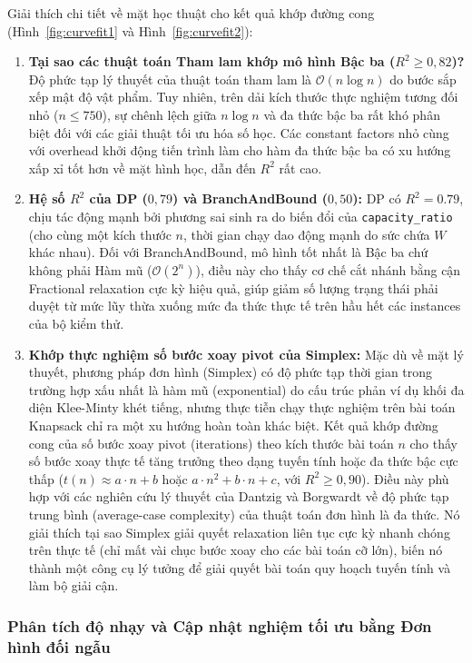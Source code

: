 \documentclass[fontsize=13pt,a4paper]{report}
\begin{document}
Giải thích chi tiết về mặt học thuật cho kết quả khớp đường cong (Hình~\ref{fig:curvefit1} và Hình~\ref{fig:curvefit2}):
\begin{enumerate}[leftmargin=*]
    \item \textbf{Tại sao các thuật toán Tham lam khớp mô hình Bậc ba ($R^2 \ge 0,82$)?}
    Độ phức tạp lý thuyết của thuật toán tham lam là $\mathcal{O}(n \log n)$ do bước sắp xếp mật độ vật phẩm. Tuy nhiên, trên dải kích thước thực nghiệm tương đối nhỏ ($n \le 750$), sự chênh lệch giữa $n \log n$ và đa thức bậc ba rất khó phân biệt đối với các giải thuật tối ưu hóa số học. Các constant factors nhỏ cùng với overhead khởi động tiến trình làm cho hàm đa thức bậc ba có xu hướng xấp xỉ tốt hơn về mặt hình học, dẫn đến $R^2$ rất cao.
    \item \textbf{Hệ số $R^2$ của DP ($0,79$) và BranchAndBound ($0,50$):}
    DP có $R^2 = 0.79$, chịu tác động mạnh bởi phương sai sinh ra do biến đổi của \texttt{capacity\_ratio} (cho cùng một kích thước $n$, thời gian chạy dao động mạnh do sức chứa $W$ khác nhau). Đối với BranchAndBound, mô hình tốt nhất là Bậc ba chứ không phải Hàm mũ ($\mathcal{O}(2^n)$), điều này cho thấy cơ chế cắt nhánh bằng cận Fractional relaxation cực kỳ hiệu quả, giúp giảm số lượng trạng thái phải duyệt từ mức lũy thừa xuống mức đa thức thực tế trên hầu hết các instances của bộ kiểm thử.
    \item \textbf{Khớp thực nghiệm số bước xoay pivot của Simplex:}
    Mặc dù về mặt lý thuyết, phương pháp đơn hình (Simplex) có độ phức tạp thời gian trong trường hợp xấu nhất là hàm mũ (exponential) do cấu trúc phản ví dụ khối đa diện Klee-Minty khét tiếng, nhưng thực tiễn chạy thực nghiệm trên bài toán Knapsack chỉ ra một xu hướng hoàn toàn khác biệt. Kết quả khớp đường cong của số bước xoay pivot (iterations) theo kích thước bài toán $n$ cho thấy số bước xoay thực tế tăng trưởng theo dạng tuyến tính hoặc đa thức bậc cực thấp ($t(n) \approx a \cdot n + b$ hoặc $a \cdot n^2 + b \cdot n + c$, với $R^2 \ge 0,90$). Điều này phù hợp với các nghiên cứu lý thuyết của Dantzig và Borgwardt về độ phức tạp trung bình (average-case complexity) của thuật toán đơn hình là đa thức. Nó giải thích tại sao Simplex giải quyết relaxation liên tục cực kỳ nhanh chóng trên thực tế (chỉ mất vài chục bước xoay cho các bài toán cỡ lớn), biến nó thành một công cụ lý tưởng để giải quyết bài toán quy hoạch tuyến tính và làm bộ giải cận.
\end{enumerate}

\FloatBarrier
\subsubsection{Phân tích độ nhạy và Cập nhật nghiệm tối ưu bằng Đơn hình đối ngẫu}
\label{subsubsec:sensitivity_analysis}
\end{document}
